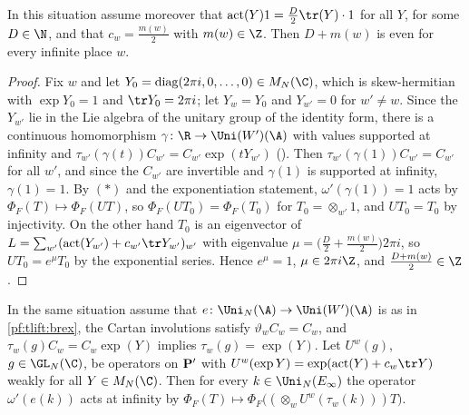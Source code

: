 \begin{lemma}[Parity]\label{pf:tlift:parity}
In this situation assume moreover that $\mathrm{act}(Y)1=\frac D2\tr(Y)\cdot1$ for all $Y$, for some $D\in\N$, and that $c_w=\frac{m(w)}2$ with
$m(w)\in\Z$. Then $D+m(w)$ is even for every infinite place $w$.
\end{lemma}

\begin{proof}
Fix $w$ and let $Y_0=\mathrm{diag}(2\pi i,0,\dots,0)\in M_N(\C)$, which is skew-hermitian with $\exp Y_0=1$ and $\tr Y_0=2\pi i$; let $Y_w=Y_0$ and
$Y_{w'}=0$ for $w'\ne w$. Since the $Y_{w'}$ lie in the Lie algebra of the unitary group of the identity form, there is a
continuous homomorphism $\gamma\colon\R\to\Uni(W')(\A)$ with values supported at infinity and $\tau_{w'}(\gamma(t))C_{w'}=C_{w'}\exp(tY_{w'})$
(). Then $\tau_{w'}(\gamma(1))C_{w'}=C_{w'}$ for all $w'$, and since the
$C_{w'}$ are invertible and $\gamma(1)$ is supported at infinity, $\gamma(1)=1$. By $(\ast)$ and the exponentiation statement,
$\omega'(\gamma(1))=1$ acts by $\Phi_F(T)\mapsto\Phi_F(UT)$, so $\Phi_F(UT_0)=\Phi_F(T_0)$ for $T_0=\otimes_{w'}1$, and $UT_0=T_0$ by injectivity.
On the other hand $T_0$ is an eigenvector of $L=\sum_{w'}(\mathrm{act}(Y_{w'})+c_{w'}\tr Y_{w'})_{w'}$ with eigenvalue
$\mu=\bigl(\frac D2+\frac{m(w)}2\bigr)2\pi i$, so $UT_0=e^\mu T_0$ by the exponential series. Hence $e^\mu=1$, $\mu\in2\pi i\Z$, and
$\frac{D+m(w)}2\in\Z$.
\end{proof}

\begin{lemma}\label{pf:tlift:actsofk}
In the same situation assume that $e\colon\Uni_N(\A)\to\Uni(W')(\A)$ is as in
\cref{pf:tlift:brex}, the Cartan involutions satisfy $\vartheta_wC_w=C_w$, and $\tau_w(g)C_w=C_w\exp(Y)$ implies $\tau_w(g)=\exp(Y)$.
Let $U^w(g)$, $g\in\GL_N(\C)$, be operators on $\mathbf{P}'$ with $U^w(\exp Y)=\exp(\mathrm{act}(Y)+c_w\tr Y)$ weakly for all $Y\in M_N(\C)$.
Then for every $k\in\Uni_N(E_\infty)$ the operator $\omega'(e(k))$ acts at infinity by
$\Phi_F(T)\mapsto\Phi_F\bigl((\otimes_wU^w(\tau_w(k)))T\bigr)$.
\end{lemma}


